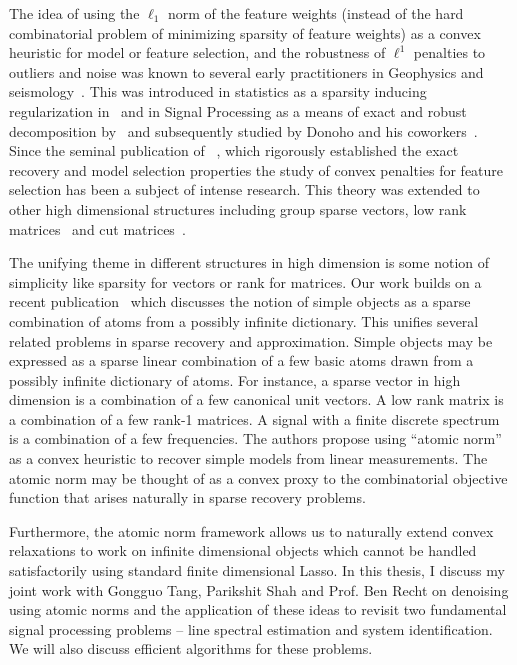 The idea of using the $\ell_1$ norm of the feature weights (instead of the hard
combinatorial problem of minimizing sparsity of feature weights) as a convex
heuristic for model or feature selection, and the robustness of $\ell^1$
penalties to outliers and noise was known to several early practitioners in
Geophysics and
seismology~\cite{claerbout:robust,taylor:deconvolution,levy:spike-train,santosa}.
This was introduced in statistics as a sparsity inducing regularization
in~\cite{tibshirani96} and in Signal Processing as a means of exact and robust
decomposition by~\cite{chen98} and subsequently studied by Donoho and his
coworkers~\cite{donoho:huo,spark}. Since the seminal publication of
~\cite{CRT06,meinshausen:variable-selection}, which rigorously established the exact recovery and model selection properties the study of convex penalties for
feature selection has been a subject of intense research. This theory was
extended to other high dimensional structures including group sparse
vectors\cite{group:lasso}, low rank matrices~\cite{recht07} and cut
matrices~\cite{cut:goemans}.


The unifying theme in different structures in high dimension is some notion of
simplicity like sparsity for vectors or rank for matrices. Our work builds on a
recent publication~\cite{crpw} which discusses the notion of simple objects as a
sparse combination of atoms from a possibly infinite dictionary. This unifies
several related problems in sparse recovery and approximation. Simple objects
may be expressed as a sparse linear combination of a few basic atoms drawn from
a possibly infinite dictionary of atoms. For instance, a sparse vector in high
dimension is a combination of a few canonical unit vectors. A low rank matrix is
a combination of a few rank-1 matrices. A signal with a finite discrete spectrum
is a combination of a few frequencies. The authors propose using ``atomic norm''
as a convex heuristic to recover simple models from linear measurements. The
atomic norm may be thought of as a convex proxy to the combinatorial objective
function that arises naturally in sparse recovery problems.

Furthermore, the atomic norm framework allows us to naturally extend convex
relaxations to work on infinite dimensional objects which cannot be handled
satisfactorily using standard finite dimensional Lasso. In this thesis, I
discuss my joint work with Gongguo Tang, Parikshit Shah and Prof. Ben Recht on
denoising using atomic norms and the application of these ideas to revisit two
fundamental signal processing problems -- line spectral estimation and system
identification. We will also discuss efficient algorithms for these problems.

